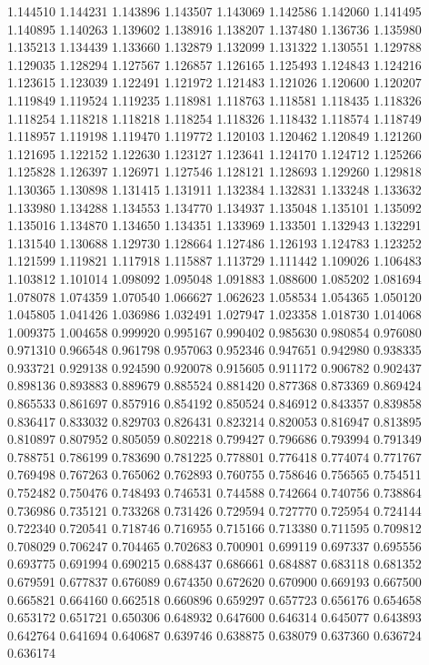 1.144510
1.144231
1.143896
1.143507
1.143069
1.142586
1.142060
1.141495
1.140895
1.140263
1.139602
1.138916
1.138207
1.137480
1.136736
1.135980
1.135213
1.134439
1.133660
1.132879
1.132099
1.131322
1.130551
1.129788
1.129035
1.128294
1.127567
1.126857
1.126165
1.125493
1.124843
1.124216
1.123615
1.123039
1.122491
1.121972
1.121483
1.121026
1.120600
1.120207
1.119849
1.119524
1.119235
1.118981
1.118763
1.118581
1.118435
1.118326
1.118254
1.118218
1.118218
1.118254
1.118326
1.118432
1.118574
1.118749
1.118957
1.119198
1.119470
1.119772
1.120103
1.120462
1.120849
1.121260
1.121695
1.122152
1.122630
1.123127
1.123641
1.124170
1.124712
1.125266
1.125828
1.126397
1.126971
1.127546
1.128121
1.128693
1.129260
1.129818
1.130365
1.130898
1.131415
1.131911
1.132384
1.132831
1.133248
1.133632
1.133980
1.134288
1.134553
1.134770
1.134937
1.135048
1.135101
1.135092
1.135016
1.134870
1.134650
1.134351
1.133969
1.133501
1.132943
1.132291
1.131540
1.130688
1.129730
1.128664
1.127486
1.126193
1.124783
1.123252
1.121599
1.119821
1.117918
1.115887
1.113729
1.111442
1.109026
1.106483
1.103812
1.101014
1.098092
1.095048
1.091883
1.088600
1.085202
1.081694
1.078078
1.074359
1.070540
1.066627
1.062623
1.058534
1.054365
1.050120
1.045805
1.041426
1.036986
1.032491
1.027947
1.023358
1.018730
1.014068
1.009375
1.004658
0.999920
0.995167
0.990402
0.985630
0.980854
0.976080
0.971310
0.966548
0.961798
0.957063
0.952346
0.947651
0.942980
0.938335
0.933721
0.929138
0.924590
0.920078
0.915605
0.911172
0.906782
0.902437
0.898136
0.893883
0.889679
0.885524
0.881420
0.877368
0.873369
0.869424
0.865533
0.861697
0.857916
0.854192
0.850524
0.846912
0.843357
0.839858
0.836417
0.833032
0.829703
0.826431
0.823214
0.820053
0.816947
0.813895
0.810897
0.807952
0.805059
0.802218
0.799427
0.796686
0.793994
0.791349
0.788751
0.786199
0.783690
0.781225
0.778801
0.776418
0.774074
0.771767
0.769498
0.767263
0.765062
0.762893
0.760755
0.758646
0.756565
0.754511
0.752482
0.750476
0.748493
0.746531
0.744588
0.742664
0.740756
0.738864
0.736986
0.735121
0.733268
0.731426
0.729594
0.727770
0.725954
0.724144
0.722340
0.720541
0.718746
0.716955
0.715166
0.713380
0.711595
0.709812
0.708029
0.706247
0.704465
0.702683
0.700901
0.699119
0.697337
0.695556
0.693775
0.691994
0.690215
0.688437
0.686661
0.684887
0.683118
0.681352
0.679591
0.677837
0.676089
0.674350
0.672620
0.670900
0.669193
0.667500
0.665821
0.664160
0.662518
0.660896
0.659297
0.657723
0.656176
0.654658
0.653172
0.651721
0.650306
0.648932
0.647600
0.646314
0.645077
0.643893
0.642764
0.641694
0.640687
0.639746
0.638875
0.638079
0.637360
0.636724
0.636174
